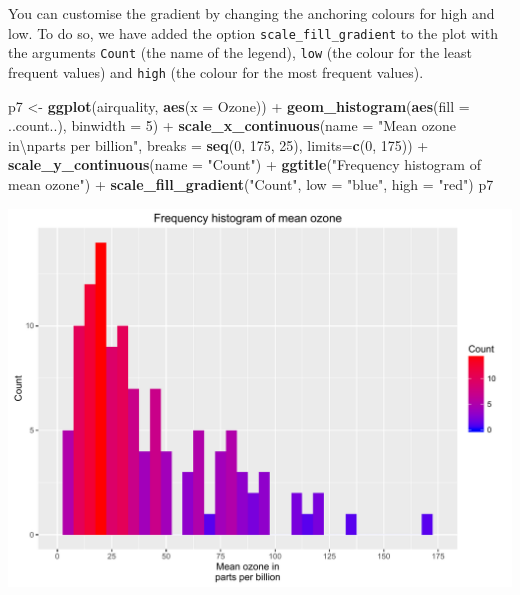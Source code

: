 \documentclass[]{article}
\newenvironment{Shaded}{\begin{snugshade}}{\end{snugshade}}
\newcommand{\KeywordTok}[1]{\textcolor[rgb]{0.13,0.29,0.53}{\textbf{{#1}}}}
\newcommand{\DataTypeTok}[1]{\textcolor[rgb]{0.13,0.29,0.53}{{#1}}}
\newcommand{\DecValTok}[1]{\textcolor[rgb]{0.00,0.00,0.81}{{#1}}}
\newcommand{\CharTok}[1]{\textcolor[rgb]{0.31,0.60,0.02}{{#1}}}
\newcommand{\StringTok}[1]{\textcolor[rgb]{0.31,0.60,0.02}{{#1}}}
\newcommand{\NormalTok}[1]{{#1}}
\begin{document}
You can customise the gradient by changing the anchoring colours for
high and low. To do so, we have added the option
\texttt{scale\_fill\_gradient} to the plot with the arguments
\texttt{Count} (the name of the legend), \texttt{low} (the colour for
the least frequent values) and \texttt{high} (the colour for the most
frequent values).

\begin{Shaded}
\begin{Highlighting}[]
\NormalTok{p7 <-}\StringTok{ }\KeywordTok{ggplot}\NormalTok{(airquality, }\KeywordTok{aes}\NormalTok{(}\DataTypeTok{x =} \NormalTok{Ozone)) +}\StringTok{ }
\StringTok{      }\KeywordTok{geom_histogram}\NormalTok{(}\KeywordTok{aes}\NormalTok{(}\DataTypeTok{fill =} \NormalTok{..count..), }\DataTypeTok{binwidth =} \DecValTok{5}\NormalTok{) +}
\StringTok{      }\KeywordTok{scale_x_continuous}\NormalTok{(}\DataTypeTok{name =} \StringTok{"Mean ozone in}\CharTok{\textbackslash{}n}\StringTok{parts per billion"}\NormalTok{,}
                         \DataTypeTok{breaks =} \KeywordTok{seq}\NormalTok{(}\DecValTok{0}\NormalTok{, }\DecValTok{175}\NormalTok{, }\DecValTok{25}\NormalTok{),}
                         \DataTypeTok{limits=}\KeywordTok{c}\NormalTok{(}\DecValTok{0}\NormalTok{, }\DecValTok{175}\NormalTok{)) +}
\StringTok{      }\KeywordTok{scale_y_continuous}\NormalTok{(}\DataTypeTok{name =} \StringTok{"Count"}\NormalTok{) +}
\StringTok{      }\KeywordTok{ggtitle}\NormalTok{(}\StringTok{"Frequency histogram of mean ozone"}\NormalTok{) +}
\StringTok{      }\KeywordTok{scale_fill_gradient}\NormalTok{(}\StringTok{"Count"}\NormalTok{, }\DataTypeTok{low =} \StringTok{"blue"}\NormalTok{, }\DataTypeTok{high =} \StringTok{"red"}\NormalTok{)}
\NormalTok{p7}
\end{Highlighting}
\end{Shaded}

\begin{center}\includegraphics{0_all_posts_pdf/histogram_12-1} \end{center}
\end{document}

